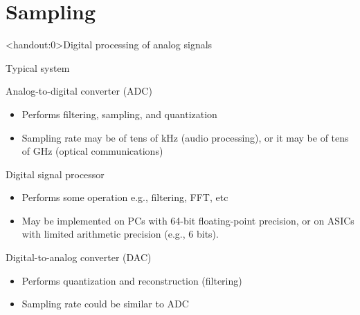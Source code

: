 \documentclass[10pt, aspectratio=169]{beamer}
\begin{document}
%
\section{Sampling}
\begin{frame}<handout:0>{Digital processing of analog signals}
\begin{block}{Typical system}
	\vspace{-0.7cm}
	\begin{center}
		\resizebox{0.7\linewidth}{!}{}
	\end{center}
\end{block}
\vspace{-0.5cm}
\begin{block}{Analog-to-digital converter (ADC)}
	\begin{itemize}
		\item Performs filtering, sampling, and quantization
		\item Sampling rate may be of tens of kHz (audio processing), or it may be of tens of GHz (optical communications)
	\end{itemize}
\end{block}
\vspace{-0.3cm}
\begin{block}{Digital signal processor}
	\begin{itemize} \itemsep 0pt
		\item Performs some operation e.g., filtering, FFT, etc
		\item May be implemented on PCs with 64-bit floating-point precision, or on ASICs with limited arithmetic precision (e.g., 6 bits).
	\end{itemize}
\end{block}
\vspace{-0.3cm}
\begin{block}{Digital-to-analog converter (DAC)}
	\begin{itemize}
		\item Performs quantization and reconstruction (filtering)
		\item Sampling rate could be similar to ADC
	\end{itemize}
\end{block}
\end{frame}
\end{document}

